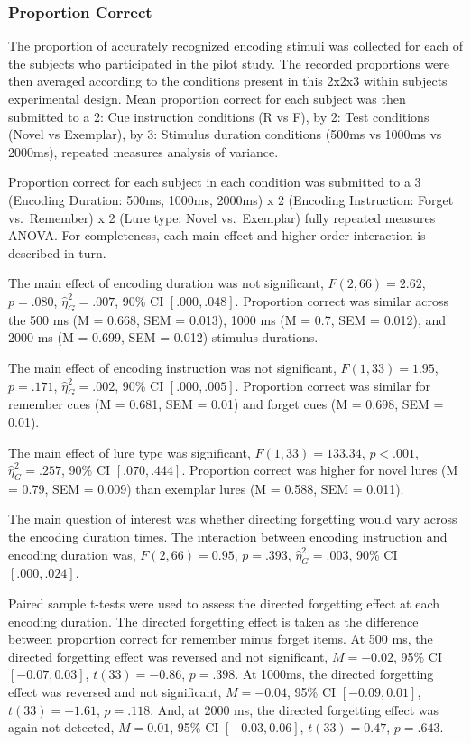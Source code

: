 \documentclass[
  english,
  man,floatsintext]{apa6}
\begin{document}
\hypertarget{proportion-correct}{%
\subsubsection{Proportion Correct}\label{proportion-correct}}

The proportion of accurately recognized encoding stimuli was collected for each of the subjects who participated in the pilot study. The recorded proportions were then averaged according to the conditions present in this 2x2x3 within subjects experimental design. Mean proportion correct for each subject was then submitted to a 2: Cue instruction conditions (R vs F), by 2: Test conditions (Novel vs Exemplar), by 3: Stimulus duration conditions (500ms vs 1000ms vs 2000ms), repeated measures analysis of variance.

Proportion correct for each subject in each condition was submitted to a 3 (Encoding Duration: 500ms, 1000ms, 2000ms) x 2 (Encoding Instruction: Forget vs.~Remember) x 2 (Lure type: Novel vs.~Exemplar) fully repeated measures ANOVA. For completeness, each main effect and higher-order interaction is described in turn.

The main effect of encoding duration was not significant, \(F(2, 66) = 2.62\), \(p = .080\), \(\hat{\eta}^2_G = .007\), 90\% CI \([.000, .048]\). Proportion correct was similar across the 500 ms (M = 0.668, SEM = 0.013), 1000 ms (M = 0.7, SEM = 0.012), and 2000 ms (M = 0.699, SEM = 0.012) stimulus durations.

The main effect of encoding instruction was not significant, \(F(1, 33) = 1.95\), \(p = .171\), \(\hat{\eta}^2_G = .002\), 90\% CI \([.000, .005]\). Proportion correct was similar for remember cues (M = 0.681, SEM = 0.01) and forget cues (M = 0.698, SEM = 0.01).

The main effect of lure type was significant, \(F(1, 33) = 133.34\), \(p < .001\), \(\hat{\eta}^2_G = .257\), 90\% CI \([.070, .444]\). Proportion correct was higher for novel lures (M = 0.79, SEM = 0.009) than exemplar lures (M = 0.588, SEM = 0.011).

The main question of interest was whether directing forgetting would vary across the encoding duration times. The interaction between encoding instruction and encoding duration was, \(F(2, 66) = 0.95\), \(p = .393\), \(\hat{\eta}^2_G = .003\), 90\% CI \([.000, .024]\).

Paired sample t-tests were used to assess the directed forgetting effect at each encoding duration. The directed forgetting effect is taken as the difference between proportion correct for remember minus forget items. At 500 ms, the directed forgetting effect was reversed and not significant, \(M = -0.02\), 95\% CI \([-0.07, 0.03]\), \(t(33) = -0.86\), \(p = .398\). At 1000ms, the directed forgetting effect was reversed and not significant, \(M = -0.04\), 95\% CI \([-0.09, 0.01]\), \(t(33) = -1.61\), \(p = .118\). And, at 2000 ms, the directed forgetting effect was again not detected, \(M = 0.01\), 95\% CI \([-0.03, 0.06]\), \(t(33) = 0.47\), \(p = .643\).
\end{document}
